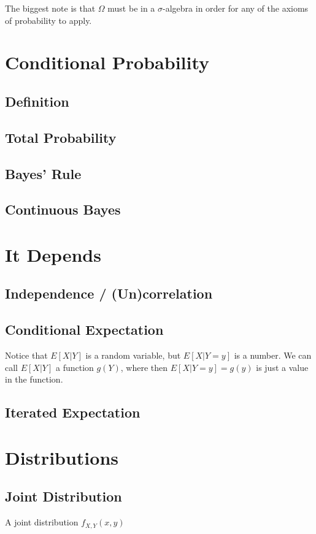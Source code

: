 \documentclass{article}
\begin{document}
The biggest note is that $\Omega$ must be in a $\sigma$-algebra in order for any of the axioms of probability to apply.
\newpage
\section{Conditional Probability}
\subsection{Definition}
\subsection{Total Probability}
\subsection{Bayes' Rule}
\subsection{Continuous Bayes}

\newpage
\section{It Depends}
\subsection{Independence / (Un)correlation}
\subsection{Conditional Expectation}
Notice that $E[X | Y]$ is a random variable, but $E[X | Y = y]$ is a number. We can call $E[X | Y]$ a function $g(Y)$, where then $E[X | Y = y] = g(y)$ is just a value in the function.
\subsection{Iterated Expectation}

\newpage
\section{Distributions}
\subsection{Joint Distribution}
\begin{definition}
	A joint distribution $f_{X, Y}(x, y)$ 
\end{definition}
\end{document}
